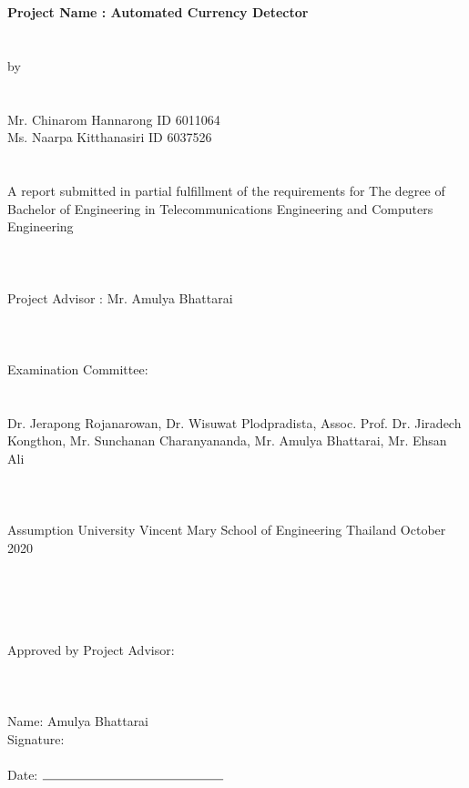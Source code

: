 \documentclass[a4paper,12pt]{report}
\begin{document}
	\begin{center}
			\textbf {\Large Project Name : Automated Currency Detector} \\  \large \indent \\ \indent \\  by \\ \indent \\ \indent \\ Mr. Chinarom Hannarong ID 6011064 \\
			Ms. Naarpa Kitthanasiri ID 6037526 \\
			\indent \\ \indent \\ 
			A report submitted in partial fulfillment of the requirements for 
			The degree of Bachelor of Engineering in
			Telecommunications Engineering and
			Computers Engineering \\ \indent \\ \indent \\ \indent \\
			
			Project Advisor :
			Mr. Amulya Bhattarai \\ \indent \\ \indent \\ \indent \\
			
			Examination Committee: \\ \indent \\ \indent \\
			
			Dr. Jerapong Rojanarowan, Dr. Wisuwat Plodpradista,
			Assoc. Prof. Dr. Jiradech Kongthon, Mr. Sunchanan Charanyananda,
			Mr. Amulya Bhattarai, Mr. Ehsan Ali \\ \indent \\ \indent \\
			\indent \\
			
			Assumption University
			Vincent Mary School of Engineering
			Thailand
			October 2020
	\end{center}
\newpage 
\indent \\ \\ \\ \\   \large Approved by Project Advisor: \\ \\ \\ \\  \indent \hspace{205}  \large Name: Amulya Bhattarai \indent \\ \indent \hspace{205}  \large Signature: \indent \\ \indent \\ \indent \hspace{205}  \large Date: $\rule{5cm}{0.15mm}$
\end{document}
